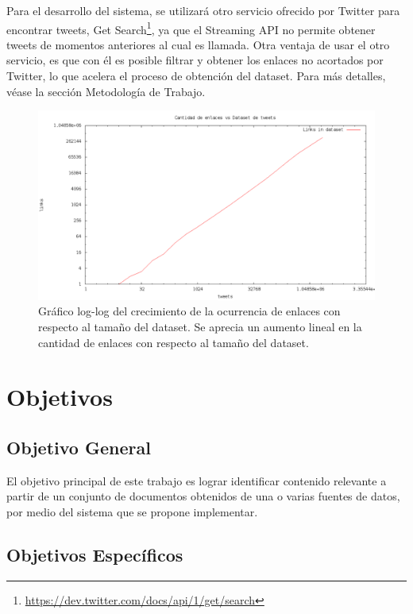 \documentclass[11pt,letterpaper]{article}
\begin{document}
   Para el desarrollo del sistema, se utilizará otro servicio ofrecido
   por Twitter para encontrar tweets, Get
   Search\footnote{\href{https://dev.twitter.com/docs/api/1/get/search}{https://dev.twitter.com/docs/api/1/get/search} }, ya que
   el Streaming API no permite obtener tweets de momentos anteriores
   al cual es llamada. Otra ventaja de usar el otro servicio, es que
   con él es posible filtrar y obtener los enlaces no acortados por
   Twitter, lo que acelera el proceso de obtención del dataset. Para
   más detalles, véase la sección Metodología de Trabajo.

   \begin{figure}[htb]
\centering
\includegraphics[width=15cm]{./img/links.png}
\caption{\label{fig:crecimiento}Gráfico log-log del crecimiento de la ocurrencia de enlaces con respecto al tamaño del dataset. Se aprecia un aumento lineal en la cantidad de enlaces con respecto al tamaño del dataset.}
\end{figure}


\pagebreak
\section{Objetivos}
\label{sec-4}

\subsection{Objetivo General}
\label{sec-4.1}

   El objetivo principal de este trabajo es lograr identificar
   contenido relevante a partir de un conjunto de documentos obtenidos
   de una o varias fuentes de datos, por medio del sistema que se
   propone implementar.

\subsection{Objetivos Específicos}
\label{sec-4.2}
\end{document}

